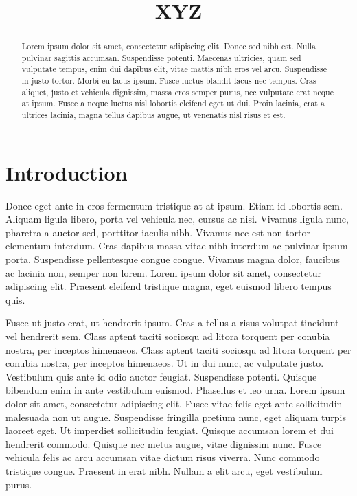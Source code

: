 \documentclass{sig-alternate}
\begin{document}
\title{XYZ}


\maketitle

\begin{abstract}
Lorem ipsum dolor sit amet, consectetur adipiscing elit. Donec sed nibh est. Nulla pulvinar sagittis accumsan. Suspendisse potenti. Maecenas ultricies, quam sed vulputate tempus, enim dui dapibus elit, vitae mattis nibh eros vel arcu. Suspendisse in justo tortor. Morbi eu lacus ipsum. Fusce luctus blandit lacus nec tempus. Cras aliquet, justo et vehicula dignissim, massa eros semper purus, nec vulputate erat neque at ipsum. Fusce a neque luctus nisl lobortis eleifend eget ut dui. Proin lacinia, erat a ultrices lacinia, magna tellus dapibus augue, ut venenatis nisl risus et est.
\end{abstract}

\section{Introduction}
\label{sec:introduction}
Donec eget ante in eros fermentum tristique at at ipsum. Etiam id lobortis sem. Aliquam ligula libero, porta vel vehicula nec, cursus ac nisi. Vivamus ligula nunc, pharetra a auctor sed, porttitor iaculis nibh. Vivamus nec est non tortor elementum interdum. Cras dapibus massa vitae nibh interdum ac pulvinar ipsum porta. Suspendisse pellentesque congue congue. Vivamus magna dolor, faucibus ac lacinia non, semper non lorem. Lorem ipsum dolor sit amet, consectetur adipiscing elit. Praesent eleifend tristique magna, eget euismod libero tempus quis.

Fusce ut justo erat, ut hendrerit ipsum. Cras a tellus a risus volutpat tincidunt vel hendrerit sem. Class aptent taciti sociosqu ad litora torquent per conubia nostra, per inceptos himenaeos. Class aptent taciti sociosqu ad litora torquent per conubia nostra, per inceptos himenaeos. Ut in dui nunc, ac vulputate justo. Vestibulum quis ante id odio auctor feugiat. Suspendisse potenti. Quisque bibendum enim in ante vestibulum euismod. Phasellus et leo urna. Lorem ipsum dolor sit amet, consectetur adipiscing elit. Fusce vitae felis eget ante sollicitudin malesuada non ut augue. Suspendisse fringilla pretium nunc, eget aliquam turpis laoreet eget. Ut imperdiet sollicitudin feugiat. Quisque accumsan lorem et dui hendrerit commodo. Quisque nec metus augue, vitae dignissim nunc. Fusce vehicula felis ac arcu accumsan vitae dictum risus viverra. Nunc commodo tristique congue. Praesent in erat nibh. Nullam a elit arcu, eget vestibulum purus.
\end{document}
